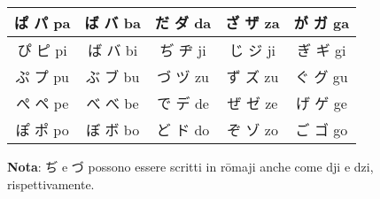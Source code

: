 \documentclass{article}
\begin{document}
        \centering
        \begin{japanese}
            \begin{tabular}{|c|c|c|c|c|}
                \hline
                ぱ パ pa & ば バ ba & だ ダ da & ざ ザ za & が ガ ga\\
                \hline
                ぴ ピ pi & ば バ bi & ぢ ヂ ji & じ ジ ji & ぎ ギ gi\\
                \hline
                ぷ プ pu & ぶ ブ bu & づ ヅ zu & ず ズ zu & ぐ グ gu\\
                \hline
                ぺ ペ pe & べ べ be & で デ de & ぜ ゼ ze & げ ゲ ge\\
                \hline
                ぽ ポ po & ぼ ボ bo & ど ド do & ぞ ゾ zo & ご ゴ go\\
                \hline
            \end{tabular}
        \end{japanese}

        \bigskip

        \textbf{Nota}: \textjapanese{ぢ} e \textjapanese{づ} possono essere scritti in rōmaji anche come \textjapanese{dji} e \textjapanese{dzi}, rispettivamente.
\end{document}
